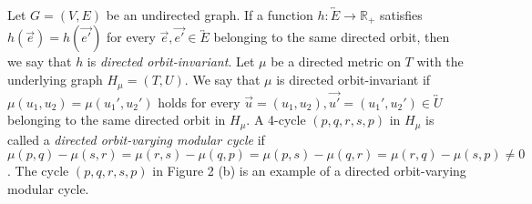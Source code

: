 \documentclass[11pt]{article}
\theoremstyle{definition}
\begin{document}

Let $G=(V,E)$ be an undirected graph. If a function $h:\overleftrightarrow{E}\rightarrow \mathbb{R}_{+}$ satisfies $h(\overrightarrow{e})=h(\overrightarrow{e'})$ for every $\overrightarrow{e},\overrightarrow{e'}\in \overleftrightarrow{E}$ belonging to the same directed orbit, then we say that $h$ is \textit{directed orbit-invariant}. Let $\mu$ be a directed metric on $T$ with the underlying graph $H_\mu=(T,U)$. We say that $\mu$ is directed orbit-invariant if $\mu(u_1,u_2)=\mu(u_1',u_2')$ holds for every $\overrightarrow{u}=(u_1,u_2),\overrightarrow{u'}=(u_1',u_2')\in \overleftrightarrow{U}$ belonging to the same directed orbit in $H_\mu$. A 4-cycle $(p,q,r,s,p)$ in $H_\mu$ is called a \textit{directed orbit-varying modular cycle} if $\mu(p,q)-\mu(s,r)=\mu(r,s)-\mu(q,p)=\mu(p,s)-\mu(q,r)=\mu(r,q)-\mu(s,p)\neq0$. The cycle $(p,q,r,s,p)$ in Figure 2 (b) is an example of a directed orbit-varying modular cycle. 
\end{document}
